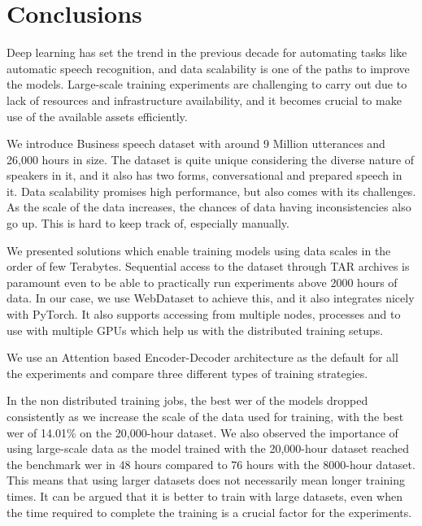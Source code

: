 \chapter{Conclusions}
\label{chapter:conclusions}

Deep learning has set the trend in the previous decade for automating tasks like automatic speech recognition, and data scalability is one of the paths to improve the models. Large-scale training experiments are challenging to carry out due to lack of resources and infrastructure availability, and it becomes crucial to make use of the available assets efficiently.

We introduce Business speech dataset with around 9 Million utterances and 26,000 hours in size. The dataset is quite unique considering the diverse nature of speakers in it, and it also has two forms, conversational and prepared speech in it. Data scalability promises high performance, but also comes with its challenges. As the scale of the data increases, the chances of data having inconsistencies also go up. This is hard to keep track of, especially manually. 

We presented solutions which enable training models using data scales in the order of few Terabytes. Sequential access to the dataset through TAR archives is paramount even to be able to practically run experiments above 2000 hours of data. In our case, we use WebDataset to achieve this, and it also integrates nicely with PyTorch. It also supports accessing from multiple nodes, processes and to use with multiple GPUs which help us with the distributed training setups. 

We use an Attention based Encoder-Decoder architecture as the default for all the experiments and compare three different types of training strategies. 

In the non distributed training jobs, the best \acrshort{wer} of the models dropped consistently as we increase the scale of the data used for training, with the best \acrshort{wer} of 14.01\% on the 20,000-hour dataset. We also observed the importance of using large-scale data as the model trained with the 20,000-hour dataset reached the benchmark \acrshort{wer} in 48 hours compared to 76 hours with the 8000-hour dataset. This means that using larger datasets does not necessarily mean longer training times. It can be argued that it is better to train with large datasets, even when the time required to complete the training is a crucial factor for the experiments.

